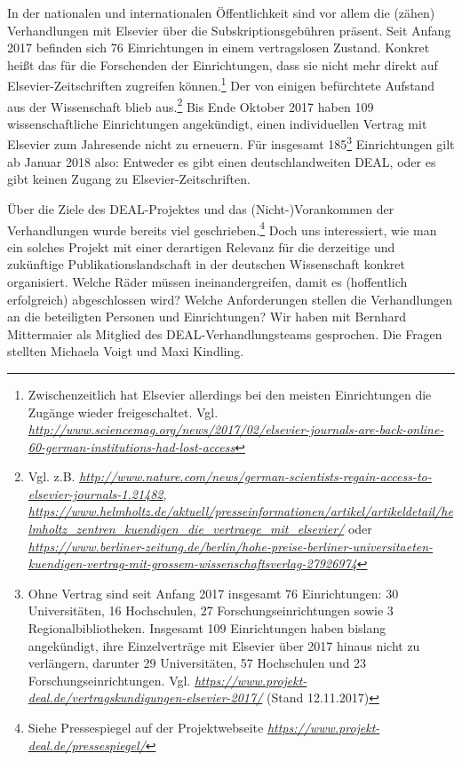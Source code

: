 \documentclass[a4paper,
fontsize=11pt,
oneside,
numbers=noperiodatend,
parskip=half-,
bibliography=totoc,
final
]{scrartcl}
\begin{document}
In der nationalen und internationalen Öffentlichkeit sind vor allem die
(zähen) Verhandlungen mit Elsevier über die Subskriptionsgebühren
präsent. Seit Anfang 2017 befinden sich 76 Einrichtungen in einem
vertragslosen Zustand. Konkret heißt das für die Forschenden der
Einrichtungen, dass sie nicht mehr direkt auf Elsevier-Zeitschriften
zugreifen können.\footnote{Zwischenzeitlich hat Elsevier allerdings bei
  den meisten Einrichtungen die Zugänge wieder freigeschaltet. Vgl.
  \href{http://www.sciencemag.org/news/2017/02/elsevier-journals-are-back-online-60-german-institutions-had-lost-access}{\emph{http://www.sciencemag.org/news/2017/02/elsevier-journals-are-back-online-60-german-institutions-had-lost-access}}}
Der von einigen befürchtete Aufstand aus der Wissenschaft blieb
aus.\footnote{Vgl. z.B.
  \href{http://www.nature.com/news/german-scientists-regain-access-to-elsevier-journals-1.21482}{\emph{http://www.nature.com/news/german-scientists-regain-access-to-elsevier-journals-1.21482}},
  \href{https://www.helmholtz.de/aktuell/presseinformationen/artikel/artikeldetail/helmholtz_zentren_kuendigen_die_vertraege_mit_elsevier/}{\emph{https://www.helmholtz.de/aktuell/presseinformationen/artikel/artikeldetail/helmholtz\_zentren\_kuendigen\_die\_vertraege\_mit\_elsevier/}}
  oder
  \href{https://www.berliner-zeitung.de/berlin/hohe-preise-berliner-universitaeten-kuendigen-vertrag-mit-grossem-wissenschaftsverlag-27926974}{\emph{https://www.berliner-zeitung.de/berlin/hohe-preise-berliner-universitaeten-kuendigen-vertrag-mit-grossem-wissenschaftsverlag-27926974}}}
Bis Ende Oktober 2017 haben 109 wissenschaftliche Einrichtungen
angekündigt, einen individuellen Vertrag mit Elsevier zum Jahresende
nicht zu erneuern. Für insgesamt 185\footnote{Ohne Vertrag sind seit
  Anfang 2017 insgesamt 76 Einrichtungen: 30 Universitäten, 16
  Hochschulen, 27 Forschungseinrichtungen sowie 3 Regionalbibliotheken.
  Insgesamt 109 Einrichtungen haben bislang angekündigt, ihre
  Einzelverträge mit Elsevier über 2017 hinaus nicht zu verlängern,
  darunter 29 Universitäten, 57 Hochschulen und 23
  Forschungseinrichtungen. Vgl.
  \href{https://www.projekt-deal.de/vertragskundigungen-elsevier-2017/}{\emph{https://www.projekt-deal.de/vertragskundigungen-elsevier-2017/}}
  (Stand 12.11.2017)} Einrichtungen gilt ab Januar 2018 also: Entweder
es gibt einen deutschlandweiten DEAL, oder es gibt keinen Zugang zu
Elsevier-Zeitschriften.

Über die Ziele des DEAL-Projektes und das (Nicht-)Vorankommen der
Verhandlungen wurde bereits viel geschrieben.\footnote{Siehe
  Pressespiegel auf der Projektwebseite
  \href{https://www.projekt-deal.de/pressespiegel/}{\emph{https://www.projekt-deal.de/pressespiegel/}}}
Doch uns interessiert, wie man ein solches Projekt mit einer derartigen
Relevanz für die derzeitige und zukünftige Publikationslandschaft in der
deutschen Wissenschaft konkret organisiert. Welche Räder müssen
ineinandergreifen, damit es (hoffentlich erfolgreich) abgeschlossen
wird? Welche Anforderungen stellen die Verhandlungen an die beteiligten
Personen und Einrichtungen? Wir haben mit Bernhard Mittermaier als
Mitglied des DEAL-Verhandlungsteams gesprochen. Die Fragen stellten
Michaela Voigt und Maxi Kindling.
\end{document}
